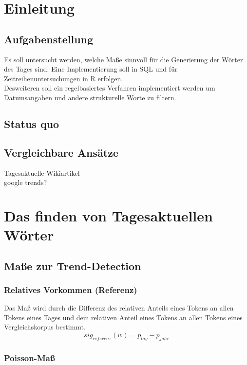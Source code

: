 


\ourtitlepage 
\tableofcontents
\clearpage
{} %
\chapter{Einleitung}
\section{Aufgabenstellung}
Es soll untersucht werden, welche Maße sinnvoll für die Generierung der Wörter des Tages sind. Eine Implementierung soll in SQL und für Zeitreihenuntersuchungen in R erfolgen.\\
Desweiteren soll ein regelbasiertes Verfahren implementiert werden um Datumsangaben und andere strukturelle Worte zu filtern.\\
\section{Status quo}
\section{Vergleichbare Ansätze}
Tagesaktuelle Wikiartikel\\
google trends?\\


\chapter{Das finden von Tagesaktuellen Wörter}
\section{Maße zur Trend-Detection}
\subsection{Relatives Vorkommen (Referenz)}
Das Maß wird durch die Differenz des relativen Anteils eines Tokens an allen Tokens eines Tages und dem relativen Anteil eines Tokens an allen Tokens eines Vergleichskorpus bestimmt. 
\begin{equation}
sig_{referenz}(w) = p_{tag} - p_{jahr}
\end{equation}

\subsection{Poisson-Maß}

